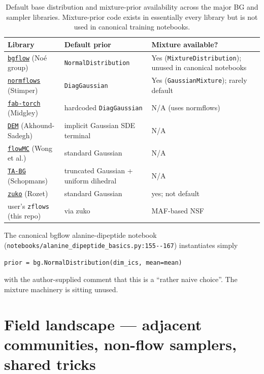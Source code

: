 \documentclass[11pt,letterpaper]{article}
\theoremstyle{plain}
\begin{document}
\begin{table}[h]
\centering\small
\begin{tabular}{@{}lll@{}}
\toprule
Library & Default prior & Mixture available? \\
\midrule
\href{https://github.com/noegroup/bgflow}{\texttt{bgflow}} (Noé group) & \verb|NormalDistribution| & Yes (\verb|MixtureDistribution|); unused in canonical notebooks\\
\href{https://github.com/VincentStimper/normalizing-flows}{\texttt{normflows}} (Stimper) & \verb|DiagGaussian| & Yes (\verb|GaussianMixture|); rarely default\\
\href{https://github.com/lollcat/fab-torch}{\texttt{fab-torch}} (Midgley) & hardcoded \verb|DiagGaussian| & N/A (uses normflows)\\
\href{https://github.com/jarridrb/DEM}{\texttt{DEM}} (Akhound-Sadegh) & implicit Gaussian SDE terminal & N/A\\
\href{https://github.com/kazewong/flowMC}{\texttt{flowMC}} (Wong et al.) & standard Gaussian & N/A\\
\href{https://github.com/aimat-lab/TA-BG}{\texttt{TA-BG}} (Schopmans) & truncated Gaussian + uniform dihedral & N/A\\
\href{https://github.com/probabilists/zuko}{\texttt{zuko}} (Rozet) & standard Gaussian & yes; not default \\
user's \texttt{zflows} (this repo) & via zuko & MAF-based NSF \\
\bottomrule
\end{tabular}
\caption{Default base distribution and mixture-prior availability across the major
BG and sampler libraries. Mixture-prior code exists in essentially every library
but is not used in canonical training notebooks.}
\end{table}

The canonical bgflow alanine-dipeptide notebook (\verb|notebooks/alanine_dipeptide_basics.py:155--167|)
instantiates simply
\begin{Verbatim}[fontsize=\small,frame=single]
prior = bg.NormalDistribution(dim_ics, mean=mean)
\end{Verbatim}
with the author-supplied comment that this is a ``rather naive choice''. The mixture
machinery is sitting unused.

\section{Field landscape --- adjacent communities, non-flow samplers, shared tricks}\label{sec:landscape}
\end{document}
